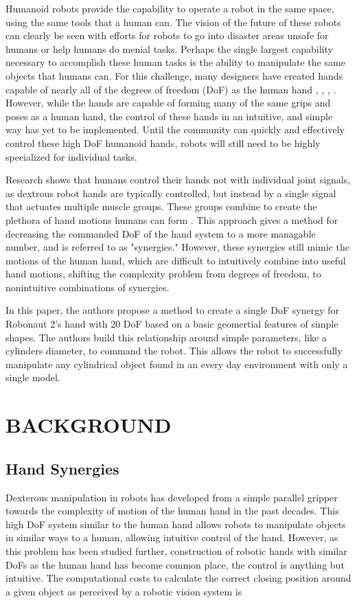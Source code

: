 \documentclass[letterpaper, 10 pt, conference]{ieeeconf}  %
\begin{document}
Humanoid robots provide the capability to operate a robot in the same space, using the same tools that a human can. The vision of the future of these robots can clearly be seen with efforts for robots to go into disaster areas unsafe for humans \cite{fukushima_robots} or help humans do menial tasks. Perhaps the single largest capability necessary to accomplish these human tasks is the ability to manipulate the same objects that humans can. For this challenge, many designers have created hands capable of nearly all of the degrees of freedom (DoF) as the human hand \cite{r2_hand}, \cite{DRL}, \cite{hrp3}, \cite{softhand}. However, while the hands are capable of forming many of the same grips and poses as a human hand, the control of these hands in an intuitive, and simple way has yet to be implemented. Until the community can quickly and effectively control these high DoF humanoid hands, robots will still need to be highly specialized for individual tasks. \par
Research shows that humans control their hands not with individual joint signals, as dextrous robot hands are typically controlled, but instead by a single signal that actuates multiple muscle groups. These groups combine to create the plethora of hand motions humans can form \cite{Santello} \cite{neuro}. This approach gives a method for decreasing the commanded DoF of the hand system to a more managable number, and is referred to as "synergies." However, these synergies still mimic the motions of the human hand, which are difficult to intuitively combine into useful hand motions, shifting the complexity problem from degrees of freedom, to nonintuitive combinations of synergies. \par
In this paper, the authors propose a method to create a single DoF synergy for Robonaut 2's hand with 20 DoF based on a basic geomertial features of simple shapes. The authors build this relationship around simple parameters, like a cylinders diameter, to command the robot. This allows the robot to successfully manipulate any cylindrical object found in an every day environment with only a single model.  

\section{BACKGROUND}

\subsection{Hand Synergies}
	Dexterous manipulation in robots has developed from a simple parallel gripper towards the complexity of motion of the human hand in the past decades. This high DoF system similar to the human hand allows robots to manipulate objects in similar ways to a human, allowing intuitive control of the hand. However, as this problem has been studied further, construction of robotic hands with similar DoFs as the human hand has become common place, the control is anything but intuitive. The computational costs to calculate the correct closing position around a given object as perceived by a robotic vision system is 
\end{document}
